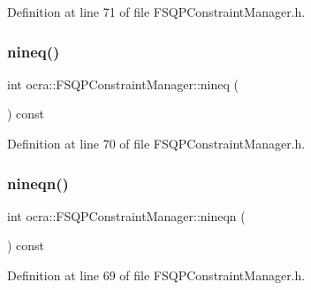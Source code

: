 Definition at line 71 of file F\+S\+Q\+P\+Constraint\+Manager.\+h.

\hypertarget{classocra_1_1FSQPConstraintManager_a83034f5a9b248cd6079f926038c14708}{}\label{classocra_1_1FSQPConstraintManager_a83034f5a9b248cd6079f926038c14708} 
\subsubsection{\texorpdfstring{nineq()}{nineq()}}
{\footnotesize\ttfamily int ocra\+::\+F\+S\+Q\+P\+Constraint\+Manager\+::nineq (\begin{DoxyParamCaption}{ }\end{DoxyParamCaption}) const\hspace{0.3cm}{\ttfamily [inline]}}



Definition at line 70 of file F\+S\+Q\+P\+Constraint\+Manager.\+h.

\hypertarget{classocra_1_1FSQPConstraintManager_a0e045890da8fece584fef4a5f72d90ad}{}\label{classocra_1_1FSQPConstraintManager_a0e045890da8fece584fef4a5f72d90ad} 
\subsubsection{\texorpdfstring{nineqn()}{nineqn()}}
{\footnotesize\ttfamily int ocra\+::\+F\+S\+Q\+P\+Constraint\+Manager\+::nineqn (\begin{DoxyParamCaption}{ }\end{DoxyParamCaption}) const\hspace{0.3cm}{\ttfamily [inline]}}



Definition at line 69 of file F\+S\+Q\+P\+Constraint\+Manager.\+h.

\hypertarget{classocra_1_1FSQPConstraintManager_ac83ac27b5edd34aed935061ca72925eb}{}\label{classocra_1_1FSQPConstraintManager_ac83ac27b5edd34aed935061ca72925eb} 
